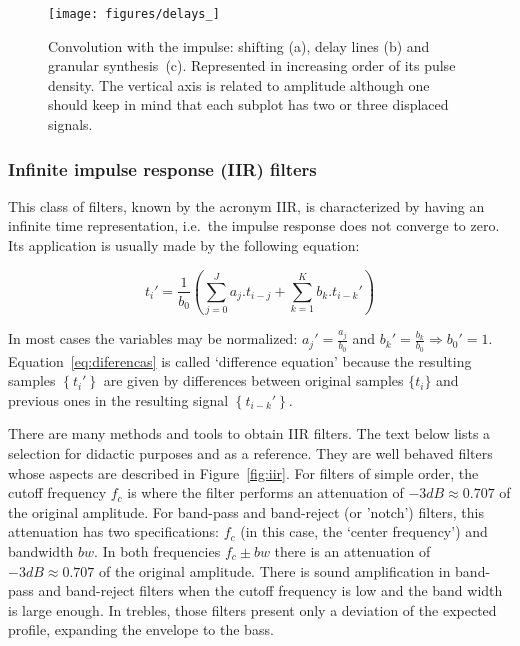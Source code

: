\begin{figure}
    \centering
        \texttt{[image: figures/delays\_]}
    \caption{Convolution with the impulse: shifting (a), delay lines (b) and granular synthesis~(c). Represented in increasing order of its pulse density. The vertical axis is related to amplitude although one should keep in mind that each subplot has two or three displaced signals.}
        \label{fig:delays}
\end{figure}

\subsubsection{Infinite impulse response (IIR) filters}
This class of filters, known by the acronym IIR, is characterized by having an infinite time representation, i.e.\ the impulse response does not converge to zero. Its application is usually made by the following equation:

\begin{equation}\label{eq:diferencas}
 t_i' = \frac{1}{b_0}\left ( \sum_{j=0}^Ja_j . t_{i-j} + \sum_{k=1}^Kb_k . t_{i-k}' \right )
\end{equation}

In most cases the variables may be normalized: $a_j'=\frac{a_j}{b_0}$ and $b_k'=\frac{b_k}{b_0} \Rightarrow b_0' = 1$.
Equation~\ref{eq:diferencas} is called `difference equation' because the resulting samples $\left\{t_i'\right\}$ are given by differences between original samples $\{t_i\}$ and previous ones in the resulting signal $\left\{t_{i-k}'\right\}$.

There are many methods and tools to obtain IIR filters. The text below lists a selection for didactic purposes and as a reference. They are well behaved filters whose aspects are described in Figure~\ref{fig:iir}. For filters of simple order, the cutoff frequency $f_c$ is where the filter performs an attenuation of $-3dB \approx 0.707 $ of the original amplitude.
For band-pass and band-reject (or 'notch') filters, this attenuation has two specifications: $f_c$ (in this case, the `center frequency') and bandwidth $bw$. In both frequencies $f_c \pm bw$ there is an attenuation of $-3dB \approx 0.707$ of the original amplitude.
There is sound amplification in band-pass and band-reject filters when the cutoff frequency is low and the band width is large enough. In trebles, those filters present only a deviation of the expected profile, expanding the envelope to the bass.

